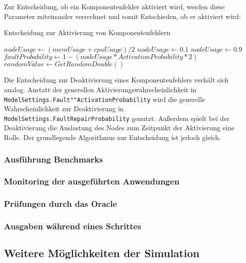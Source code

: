 Zur Entscheidung, ob ein Komponentenfehler aktiviert wird, werden diese Parameter miteinander verrechnet und somit Entschieden, ob er aktiviert wird:

\begin{algorithm}
    \label{alg:faultActivation}
    \caption{Entscheidung zur Aktivierung von Komponentenfehlern}
    \begin{algorithmic}[1]
        \STATE $nodeUsage \gets (memUsage + cpuUsage) / 2$
            \STATE $nodeUsage \gets 0.1$
        \ENDIF
            \STATE $nodeUsage \gets 0.9$
        \ENDIF
        \STATE $faultProbability \gets 1 - (nodeUsage * ActivationProbability * 2)$
        \STATE $randomValue \gets GetRandomDouble()$
            \RETURN \TRUE {}
        \ELSE
            \RETURN \FALSE {}
        \ENDIF
    \end{algorithmic}
\end{algorithm}

Die Entscheidung zur Deaktivierung eines Komponentenfehlers verhält sich analog.
Anstatt der generellen Aktivierungswahrscheinlichkeit in \texttt{ModelSettings.Fault""ActivationProbability} wird die generelle Wahrscheinlichkeit zur Deaktivierung in \texttt{ModelSettings.FaultRepairProbability} genutzt.
Außerdem spielt bei der Deaktivierung die Auslastung des Nodes zum Zeitpunkt der Aktivierung eine Rolle.
Der grundlegende Algorithmus zur Entscheidung ist jedoch gleich.

\subsubsection{Ausführung Benchmarks}\label{sec:simulationBenchmarkExecution}


\subsubsection{Monitoring der ausgeführten Anwendungen}\label{sec:simulationMonitoring}


\subsubsection{Prüfungen durch das Oracle}\label{sec:simulationOracle}


\subsubsection{Ausgaben während eines Schrittes}\label{sec:simulationStepOutput}


\subsection{Weitere Möglichkeiten der Simulation}\label{sec:simulationUtilities}
